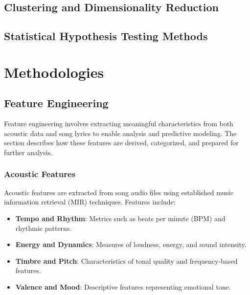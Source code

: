 \section{Clustering and Dimensionality Reduction}
\label{sec:clusteringanddimensionalityreduction}


\section{Statistical Hypothesis Testing Methods}
\label{sec:statisticalhypothesistestingmethods}



\chapter{Methodologies}
\label{cha:methodologies}



\section{Feature Engineering}
\label{sec:featureengineering}

Feature engineering involves extracting meaningful characteristics from both acoustic data and song lyrics to enable analysis and predictive modeling. The section describes how these features are derived, categorized, and prepared for further analysis.

\subsection{Acoustic Features}
\label{sec:acousticfeatures}

Acoustic features are extracted from song audio files using established music information retrieval (MIR) techniques. Features include:

\begin{itemize}
  \item \textbf{Tempo and Rhythm}: Metrics such as beats per minute (BPM) and rhythmic patterns.
  \item \textbf{Energy and Dynamics}: Measures of loudness, energy, and sound intensity.
  \item \textbf{Timbre and Pitch}: Characteristics of tonal quality and frequency-based features.
  \item \textbf{Valence and Mood}: Descriptive features representing emotional tone.
\end{itemize}

